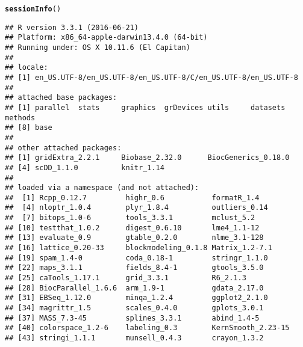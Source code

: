 \documentclass{article}\usepackage[]{graphicx}\usepackage[]{color}
\makeatletter
\newcommand{\hlstd}[1]{\textcolor[rgb]{0.345,0.345,0.345}{#1}}%
\newcommand{\hlkwd}[1]{\textcolor[rgb]{0.737,0.353,0.396}{\textbf{#1}}}%
\newenvironment{kframe}{%
 \def\at@end@of@kframe{}%
 \ifinner\ifhmode%
  \def\at@end@of@kframe{\end{minipage}}%
  \begin{minipage}{\columnwidth}%
 \fi\fi%
 \def\FrameCommand##1{\hskip\@totalleftmargin \hskip-\fboxsep
 \colorbox{shadecolor}{##1}\hskip-\fboxsep
     \hskip-\linewidth \hskip-\@totalleftmargin \hskip\columnwidth}%
 \MakeFramed {\advance\hsize-\width
   \@totalleftmargin\z@ \linewidth\hsize
   \@setminipage}}%
 {\par\unskip\endMakeFramed%
 \at@end@of@kframe}
\newenvironment{knitrout}{}{} %
\makeatother
\begin{document}
\begin{knitrout}
\color{fgcolor}\begin{kframe}
\begin{alltt}
\hlkwd{sessionInfo}\hlstd{()}
\end{alltt}
\begin{verbatim}
## R version 3.3.1 (2016-06-21)
## Platform: x86_64-apple-darwin13.4.0 (64-bit)
## Running under: OS X 10.11.6 (El Capitan)
## 
## locale:
## [1] en_US.UTF-8/en_US.UTF-8/en_US.UTF-8/C/en_US.UTF-8/en_US.UTF-8
## 
## attached base packages:
## [1] parallel  stats     graphics  grDevices utils     datasets  methods  
## [8] base     
## 
## other attached packages:
## [1] gridExtra_2.2.1     Biobase_2.32.0      BiocGenerics_0.18.0
## [4] scDD_1.1.0          knitr_1.14         
## 
## loaded via a namespace (and not attached):
##  [1] Rcpp_0.12.7         highr_0.6           formatR_1.4        
##  [4] nloptr_1.0.4        plyr_1.8.4          outliers_0.14      
##  [7] bitops_1.0-6        tools_3.3.1         mclust_5.2         
## [10] testthat_1.0.2      digest_0.6.10       lme4_1.1-12        
## [13] evaluate_0.9        gtable_0.2.0        nlme_3.1-128       
## [16] lattice_0.20-33     blockmodeling_0.1.8 Matrix_1.2-7.1     
## [19] spam_1.4-0          coda_0.18-1         stringr_1.1.0      
## [22] maps_3.1.1          fields_8.4-1        gtools_3.5.0       
## [25] caTools_1.17.1      grid_3.3.1          R6_2.1.3           
## [28] BiocParallel_1.6.6  arm_1.9-1           gdata_2.17.0       
## [31] EBSeq_1.12.0        minqa_1.2.4         ggplot2_2.1.0      
## [34] magrittr_1.5        scales_0.4.0        gplots_3.0.1       
## [37] MASS_7.3-45         splines_3.3.1       abind_1.4-5        
## [40] colorspace_1.2-6    labeling_0.3        KernSmooth_2.23-15 
## [43] stringi_1.1.1       munsell_0.4.3       crayon_1.3.2
\end{verbatim}
\end{kframe}
\end{knitrout}


\end{document}
